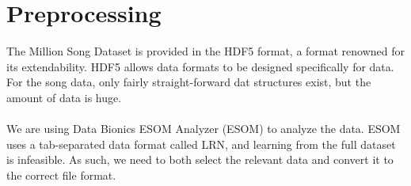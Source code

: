\section{Preprocessing} %
\label{sec:preprocessing}

The Million Song Dataset is provided in the HDF5 format, a format renowned for its extendability. HDF5
allows data formats to be designed specifically for data. \citep{hdfgrp} For the song data, only fairly straight-forward dat
structures exist, but the amount of data is huge.
\\\\
We are using Data Bionics ESOM Analyzer (ESOM) to analyze the data. ESOM uses a tab-separated data format called LRN, and learning
from the full dataset is infeasible. As such, we need to both select the relevant data and convert it to the correct file format.



